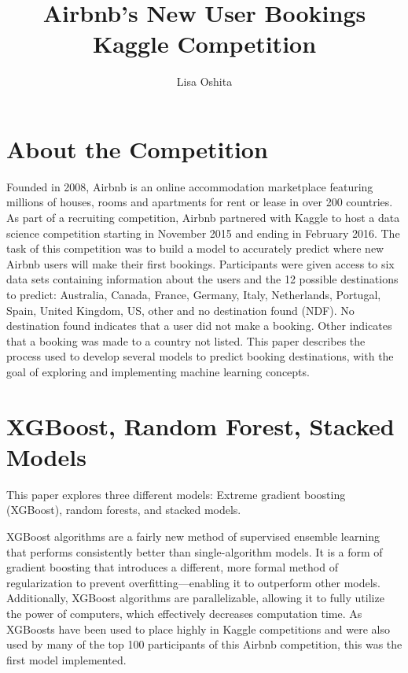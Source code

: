 \documentclass{article}
\title{Airbnb's New User Bookings Kaggle Competition}
\author{Lisa Oshita}
\begin{document}


\maketitle


\section{About the Competition}


Founded in 2008, Airbnb is an online accommodation marketplace featuring millions of houses,
rooms and apartments for rent or lease in over 200 countries. As part of a recruiting competition,
Airbnb partnered with Kaggle to host a data science competition starting in November 2015 and ending
in February 2016. The task of this competition was to build a model to accurately predict where new
Airbnb users will make their first bookings. Participants were given access to six data sets containing
information about the users and the 12 possible destinations to predict: Australia, Canada, France, 
Germany, Italy, Netherlands, Portugal, Spain, United Kingdom, US, other and no destination found (NDF). 
No destination found indicates that a user did not make a booking. Other indicates that a booking 
was made to a country not listed. This paper describes the process used to develop several models 
to predict booking destinations, with the goal of exploring and implementing machine learning concepts.



\section{XGBoost, Random Forest, Stacked Models}

This paper explores three different models: Extreme gradient boosting (XGBoost), random forests, and stacked models. 

XGBoost algorithms are a fairly new method of supervised ensemble learning that performs consistently 
better than single-algorithm models. It is a form of gradient boosting that introduces a different, more 
formal method of regularization to prevent overfitting---enabling it to outperform other models. Additionally, 
XGBoost algorithms are parallelizable, allowing it to fully utilize the power of computers, which effectively 
decreases computation time. As XGBoosts have been used to place highly in Kaggle competitions and were 
also used by many of the top 100 participants of this Airbnb competition, this was the first model implemented.
\end{document}
